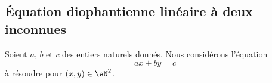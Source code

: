 \subsection{Équation diophantienne linéaire à deux inconnues}
\label{subsecZVKNooXNjPSf}



Soient \( a\), \( b\) et \( c\) des entiers naturels donnés. Nous considérons l'équation
\begin{equation}        \label{EqTOVSooJbxlIq}
    ax+by=c
\end{equation}
à résoudre\cite{PAYUooYVuNAB} pour \( (x,y)\in \eN^2\).

